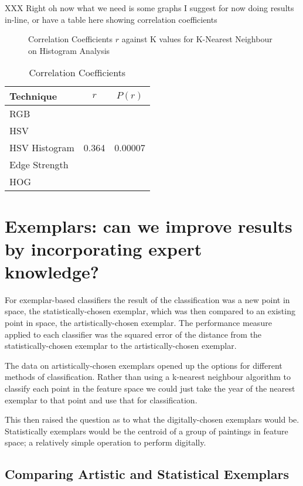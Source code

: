 \documentclass[conference,a4paper]{IEEEtran}
\begin{document}
 XXX Right oh now what we need is some graphs
 I suggest for now doing results in-line, or have a table here showing 
 correlation coefficients 

\begin{figure}[h]
\centering

\caption{Correlation Coefficients $r$ against K values for K-Nearest Neighbour on Histogram Analysis}
\end{figure}

\begin{table}[h]
\centering
\begin{tabular}{|p{3.5cm}|c|c|}
Technique     & $r$ & $P(r)$ \\ \hline
RGB           &       &         \\
HSV           &       &         \\
HSV Histogram & 0.364 & 0.00007 \\
Edge Strength &       &         \\
HOG           &       &         \\
\end{tabular}
\caption{Correlation Coefficients}\label{tab:results}
\end{table}

\section{Exemplars: can we improve results by incorporating expert knowledge? }


For exemplar-based classifiers the result of the classification was a new point
in space, the statistically-chosen exemplar, which was then compared to an
existing point in space, the artistically-chosen exemplar. The performance
measure applied to each classifier was the squared error of the distance from
the statistically-chosen exemplar to the artistically-chosen exemplar.


The data on artistically-chosen exemplars opened up the options for different methods of
classification. Rather than using a k-nearest neighbour algorithm to classify each point in the
feature space we could just take the year of the nearest exemplar to that point and use that for
classification.

This then raised the question as to what the digitally-chosen exemplars would be. Statistically 
exemplars would be the centroid of a group of paintings in feature space; a relatively simple 
operation to perform digitally.

\subsection{Comparing Artistic and Statistical Exemplars}
\end{document}

